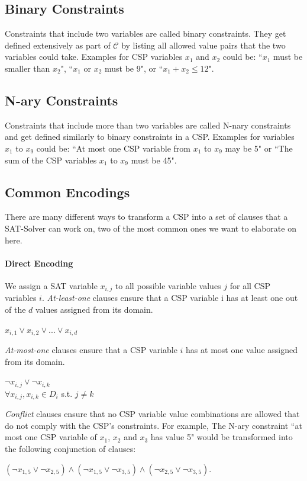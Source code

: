 \subsection{Binary Constraints}
Constraints that include two variables are called binary constraints. They get defined extensively as part of $\mathcal{C}$ by listing all allowed value pairs that the two variables could take. Examples for CSP variables $x_1$ and $x_2$ could be: ``$x_1$ must be smaller than $x_2$", ``$x_1$ or $x_2$ must be 9", or ``$x_1 + x_2 \leq 12$".

\subsection{N-ary Constraints}
Constraints that include more than two variables are called N-nary constraints and get defined similarly to binary constraints in a CSP. Examples for variables $x_1$ to $x_9$ could be: ``At most one CSP variable from $x_1$ to $x_9$ may be 5" or ``The sum of the CSP variables $x_1$ to $x_9$ must be 45".

\subsection{Common Encodings}
There are many different ways to transform a CSP into a set of clauses that a SAT-Solver can work on, two of the most common ones we want to elaborate on here.

\paragraph{Direct Encoding \cite{walsh2000SATvCSP}\cite{gent20002ArcConsistencyInSAT}}
We assign a SAT variable $x_{i,j}$ to all possible variable values $j$ for all CSP variables $i$. \emph{At-least-one} clauses ensure that a CSP variable i has at least one out of the $d$ values assigned from its domain.
\begin{center}
    $x_{i,1} \lor x_{i,2} \lor ... \lor x_{i,d}$
\end{center}

\emph{At-most-one} clauses ensure that a CSP variable $i$ has at most one value assigned from its domain.
\begin{center}
    $\neg x_{i,j} \lor \neg x_{i,k}$\\
    $\forall x_{i,j}, x_{i,k} \in D_i$ s.t. $j\neq k$ 
\end{center}

\emph{Conflict} clauses ensure that no CSP variable value combinations are allowed that do not comply with the CSP's constraints.
For example, The N-ary constraint ``at most one CSP variable of $x_1$, $x_2$ and $x_3$ has value 5" would be transformed into the following conjunction of clauses:
\begin{center}
 $(\neg x_{1,5} \lor \neg x_{2,5}) \land (\neg x_{1,5} \lor \neg x_{3,5}) \land (\neg x_{2,5} \lor \neg x_{3,5})$. 
\end{center}

